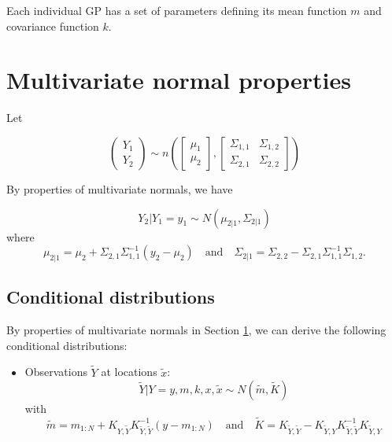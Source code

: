 \documentclass{article}
\newcommand{\1}{\mathbbm{1}}
\begin{document}
Each individual GP has a set of parameters defining its mean function $m$ and
covariance function $k$.


\appendix
\section{Multivariate normal properties}
\label{app:normal}

Let

\[
\left( \begin{array}{c} Y_1 \\ Y_2 \end{array} \right) \sim
n\left(\left[\begin{array}{c} \mu_1 \\ \mu_2 \end{array} \right] ,
\left[\begin{array}{cc} \Sigma_{1,1} & \Sigma_{1,2} \\
\Sigma_{2,1} & \Sigma_{2,2} \end{array} \right]\right)
\]

By properties of multivariate normals, we have

\[
Y_2|Y_1=y_1 \sim N\left(\mu_{2|1}, \Sigma_{2|1}\right)
\]
where
\[
\mu_{2|1} = \mu_2 + \Sigma_{2,1}\Sigma_{1,1}^{-1}(y_2-\mu_2)
\quad \mbox{and} \quad
\Sigma_{2|1} = \Sigma_{2,2} - \Sigma_{2,1}\Sigma_{1,1}^{-1}\Sigma_{1,2}.
\]

\subsection{Conditional distributions}

By properties of multivariate normals in Section \ref{app:normal},
we can derive the following conditional distributions:
\begin{itemize}
\item Observations $\tilde{Y}$ at locations $\tilde{x}$:
\[
\tilde{Y}|Y=y,m,k,x,\tilde{x} \sim N\left(\tilde{m},\tilde{K}\right)
\]
with
\[
\tilde{m} = m_{1:N} + K_{Y,\tilde{Y}}K_{\tilde{Y},\tilde{Y}}^{-1}(y-m_{1:N})
\quad \mbox{and} \quad
\tilde{K} = K_{\tilde{Y},\tilde{Y}} - K_{\tilde{Y},Y}K_{\tilde{Y},\tilde{Y}}^{-1}K_{\tilde{Y},Y}
\]
\end{itemize}



\end{document}
